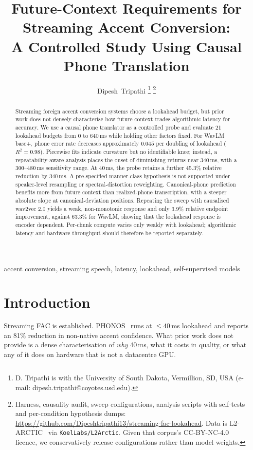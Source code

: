 \documentclass[journal]{IEEEtran}
\title{Future-Context Requirements for Streaming Accent Conversion:\\
A Controlled Study Using Causal Phone Translation}
\author{Dipesh~Tripathi%
\thanks{D. Tripathi is with the University of South Dakota, Vermillion, SD,
USA (e-mail: dipesh.tripathi@coyotes.usd.edu).}%
\thanks{Harness, causality audit, sweep configurations, analysis scripts with
self-tests and per-condition hypothesis dumps:
\url{https://github.com/Dipeshtripathi13/streaming-fac-lookahead}. Data is
L2-ARCTIC~\protect\cite{l2arctic2018} via \texttt{KoelLabs/L2Arctic}. Given
that corpus's CC-BY-NC-4.0 licence, we conservatively release configurations
rather than model weights.}}
\begin{document}
\maketitle



\begin{abstract}
\noindent Streaming foreign accent conversion systems choose a lookahead
budget, but prior work does not densely characterise how future context trades
algorithmic latency for accuracy. We use a causal phone translator as a
controlled probe and evaluate 21 lookahead budgets from 0 to 640\,ms while
holding other factors fixed. For WavLM base+, phone error rate decreases
approximately $0.045$ per doubling of lookahead ($R^2=0.98$). Piecewise fits
indicate curvature but no identifiable knee; instead, a repeatability-aware
analysis places the onset of diminishing returns near 340\,ms, with a
300--480\,ms sensitivity range. At 40\,ms, the probe retains a further 45.3\%
relative reduction by 340\,ms. A pre-specified manner-class hypothesis is not
supported under speaker-level resampling or spectral-distortion reweighting.
Canonical-phone prediction benefits more from future context than
realized-phone transcription, with a steeper absolute slope at
canonical-deviation positions. Repeating the sweep with causalised
wav2vec 2.0 yields a weak, non-monotonic response and only 3.9\% relative
endpoint improvement, against 63.3\% for WavLM, showing that the lookahead
response is encoder dependent. Per-chunk compute varies only weakly with
lookahead; algorithmic latency and hardware throughput should therefore be
reported separately.
\end{abstract}


\begin{IEEEkeywords}
accent conversion, streaming speech, latency, lookahead, self-supervised models
\end{IEEEkeywords}

\section{Introduction}

Streaming FAC is established. PHONOS~\cite{phonos2026} runs at
${\leq}40$\,ms lookahead and reports an 81\% reduction in non-native accent
confidence. What prior work does not provide is a dense characterisation of \emph{why} 40\,ms, what it
costs in quality, or what any of it does on hardware that is not a datacentre
GPU.
\end{document}
